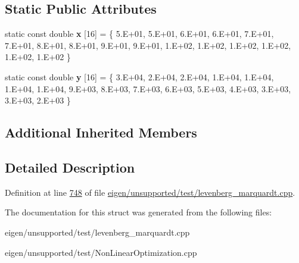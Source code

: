 \subsection*{Static Public Attributes}
\begin{DoxyCompactItemize}
\item 
\mbox{\label{struct_m_g_h10__functor_a459327d5261b90b877f5c21a644d9483}} 
static const double {\bfseries x} \mbox{[}16\mbox{]} = \{ 5.\+E+01, 5.\+E+01, 6.\+E+01, 6.\+E+01, 7.\+E+01, 7.\+E+01, 8.\+E+01, 8.\+E+01, 9.\+E+01, 9.\+E+01, 1.\+E+02, 1.\+E+02, 1.\+E+02, 1.\+E+02, 1.\+E+02, 1.\+E+02 \}
\item 
\mbox{\label{struct_m_g_h10__functor_ac4efa7aa838a12cf26294b97701b5cbf}} 
static const double {\bfseries y} \mbox{[}16\mbox{]} = \{ 3.\+E+04, 2.\+E+04, 2.\+E+04, 1.\+E+04, 1.\+E+04, 1.\+E+04, 1.\+E+04, 9.\+E+03, 8.\+E+03, 7.\+E+03, 6.\+E+03, 5.\+E+03, 4.\+E+03, 3.\+E+03, 3.\+E+03, 2.\+E+03 \}
\end{DoxyCompactItemize}
\subsection*{Additional Inherited Members}


\subsection{Detailed Description}


Definition at line \hyperlink{eigen_2unsupported_2test_2levenberg__marquardt_8cpp_source_l00748}{748} of file \hyperlink{eigen_2unsupported_2test_2levenberg__marquardt_8cpp_source}{eigen/unsupported/test/levenberg\+\_\+marquardt.\+cpp}.



The documentation for this struct was generated from the following files\+:\begin{DoxyCompactItemize}
\item 
eigen/unsupported/test/levenberg\+\_\+marquardt.\+cpp\item 
eigen/unsupported/test/\+Non\+Linear\+Optimization.\+cpp\end{DoxyCompactItemize}
